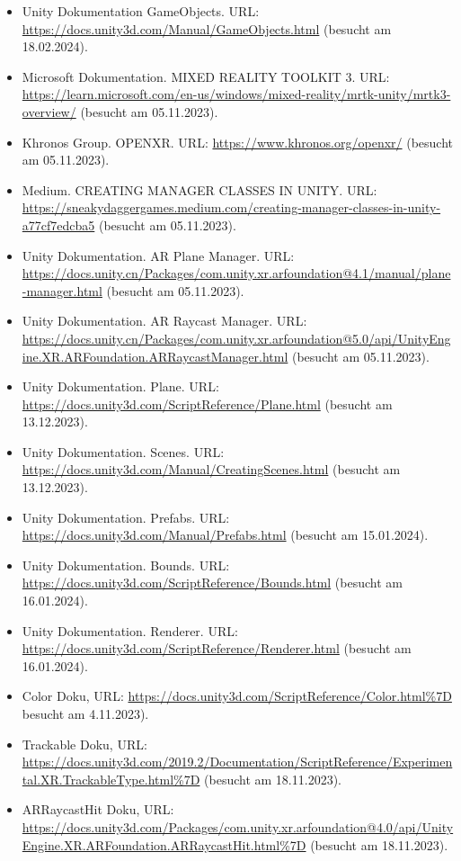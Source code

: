 \begin{itemize}
    \item Unity Dokumentation GameObjects. URL: \url{https://docs.unity3d.com/Manual/GameObjects.html} (besucht am 18.02.2024).
    \item Microsoft Dokumentation. MIXED REALITY TOOLKIT 3. URL: \url{https://learn.microsoft.com/en-us/windows/mixed-reality/mrtk-unity/mrtk3-overview/} (besucht am 05.11.2023).
    \item Khronos Group. OPENXR. URL: \url{https://www.khronos.org/openxr/} (besucht am 05.11.2023).
    \item Medium. CREATING MANAGER CLASSES IN UNITY. URL: \url{https://sneakydaggergames.medium.com/creating-manager-classes-in-unity-a77cf7edcba5} (besucht am 05.11.2023).
    \item Unity Dokumentation. AR Plane Manager. URL: \url{https://docs.unity.cn/Packages/com.unity.xr.arfoundation@4.1/manual/plane-manager.html} (besucht am 05.11.2023).
    \item Unity Dokumentation. AR Raycast Manager. URL: \url{https://docs.unity.cn/Packages/com.unity.xr.arfoundation@5.0/api/UnityEngine.XR.ARFoundation.ARRaycastManager.html} (besucht am 05.11.2023).
    \item Unity Dokumentation. Plane. URL: \url{https://docs.unity3d.com/ScriptReference/Plane.html} (besucht am 13.12.2023).
    \item Unity Dokumentation. Scenes. URL: \url{https://docs.unity3d.com/Manual/CreatingScenes.html} (besucht am 13.12.2023).
    \item Unity Dokumentation. Prefabs. URL: \url{https://docs.unity3d.com/Manual/Prefabs.html} (besucht am 15.01.2024).
    \item Unity Dokumentation. Bounds. URL: \url{https://docs.unity3d.com/ScriptReference/Bounds.html} (besucht am 16.01.2024).
    \item Unity Dokumentation. Renderer. URL: \url{https://docs.unity3d.com/ScriptReference/Renderer.html} (besucht am 16.01.2024).
    \item Color Doku, URL:  \url{https://docs.unity3d.com/ScriptReference/Color.html%7D} besucht am 4.11.2023).
    \item Trackable Doku, URL:  \url{https://docs.unity3d.com/2019.2/Documentation/ScriptReference/Experimental.XR.TrackableType.html%7D} (besucht am 18.11.2023).
    \item ARRaycastHit Doku, URL:  \url{https://docs.unity3d.com/Packages/com.unity.xr.arfoundation@4.0/api/UnityEngine.XR.ARFoundation.ARRaycastHit.html%7D} (besucht am 18.11.2023).

\end{itemize}
